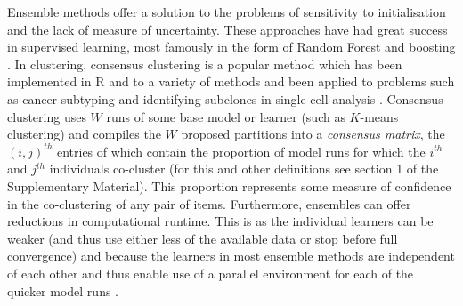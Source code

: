 \documentclass{bioinfo}
\begin{document}
Ensemble methods offer a solution to the problems of sensitivity to initialisation and the lack of measure of uncertainty. These approaches have had great success in supervised learning, most famously in the form of Random Forest \citep{breiman2001random} and boosting \citep{friedman2002stochastic}. In clustering, consensus clustering \citep{monti2003consensus} is a popular method which has been implemented in R \citep{wilkerson2010consensusclusterplus} and to a variety of methods \citep{john2020m3c, gu2020cola} and been applied to problems such as cancer subtyping \citep{lehmann2011identification, verhaak2010integrated} and identifying subclones in single cell analysis \citep{kiselev2017sc3}. Consensus clustering uses $W$ runs of some base model or learner (such as $K$-means clustering) and compiles the $W$ proposed partitions into a \emph{consensus matrix}, the $(i, j)^{th}$ entries of which contain the proportion of model runs for which the $i^{th}$ and $j^{th}$ individuals co-cluster (for this and other definitions see section 1 of the Supplementary Material). This proportion represents some measure of confidence in the co-clustering of any pair of items. Furthermore, ensembles can offer reductions in computational runtime. This is as the individual learners can be weaker (and thus use either less of the available data or stop before full convergence) and because the learners in most ensemble methods are independent of each other and thus enable use of a parallel environment for each of the quicker model runs \citep{ghaemi2009survey}. 

\end{document}
